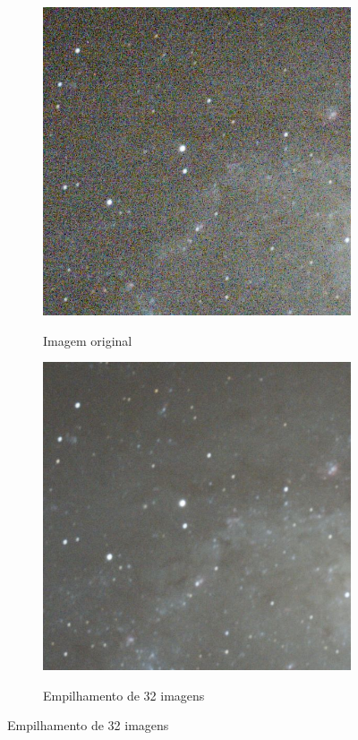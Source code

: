 \begin{figure}[!htb]
	\centering
	\caption{Efeito da combinação de imagens.}
	\begin{subfigure}[b]{0.49\textwidth}
		\centering
		\caption{Imagem original}
		\includegraphics[width=\textwidth]{figuras/Stack_1}
		\label{noCalibration}
	\end{subfigure}
 	\hfill
 	\begin{subfigure}[b]{0.49\textwidth}
 		\centering
	 	\caption{Empilhamento de 32 imagens}
	 	\includegraphics[width=\textwidth]{figuras/Stack_32}
	 	\label{withCalibration}
	 \end{subfigure}

\end{figure}


